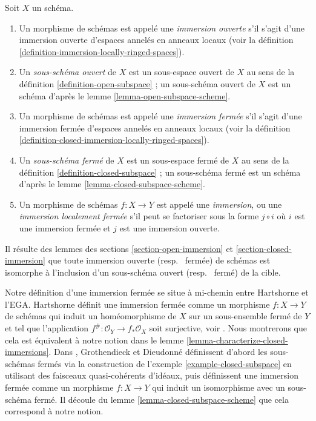 \begin{definition}
\label{definition-immersion}
Soit $X$ un schéma.
\begin{enumerate}
\item Un morphisme de schémas est appelé une {\it immersion ouverte}
s'il s'agit d'une immersion ouverte d'espaces annelés en anneaux
locaux (voir la définition \ref{definition-immersion-locally-ringed-spaces}).
\item Un {\it sous-schéma ouvert} de $X$ est un sous-espace ouvert
de $X$ au sens de la définition \ref{definition-open-subspace} ; un sous-schéma ouvert
de $X$ est un schéma d'après le lemme \ref{lemma-open-subspace-scheme}.
\item Un morphisme de schémas est appelé une {\it immersion fermée}
s'il s'agit d'une immersion fermée d'espaces annelés en anneaux
locaux (voir la définition \ref{definition-closed-immersion-locally-ringed-spaces}).
\item Un {\it sous-schéma fermé} de $X$ est un sous-espace fermé
de $X$ au sens de la définition \ref{definition-closed-subspace} ; un sous-schéma fermé est
un schéma d'après le lemme \ref{lemma-closed-subspace-scheme}.
\item Un morphisme de schémas $f : X \to Y$ est appelé une {\it immersion}, ou une
{\it immersion localement fermée} s'il peut se factoriser sous la
forme $j \circ i$ où $i$ est une immersion fermée et $j$ est une immersion
ouverte.
\end{enumerate}
\end{definition}

\noindent
Il résulte des lemmes des sections \ref{section-open-immersion} et
\ref{section-closed-immersion} que toute immersion ouverte (resp. \ fermée) de
schémas est isomorphe à l'inclusion d'un sous-schéma ouvert (resp. \ fermé)
de la cible.

\medskip\noindent
Notre définition d'une immersion fermée se situe à mi-chemin entre Hartshorne
et l'EGA. Hartshorne définit une immersion fermée comme un morphisme $f : X \to Y$ de
schémas qui induit un homéomorphisme de $X$ sur un sous-ensemble fermé de $Y$
et tel que l'application $f^\# : \mathcal{O}_Y \to f_*\mathcal{O}_X$ soit surjective,
voir \cite[Page 85]{H}. Nous montrerons que cela est équivalent à notre
notion dans le lemme \ref{lemma-characterize-closed-immersions}. Dans
\cite{EGA}, Grothendieck et Dieudonné définissent d'abord les sous-schémas
fermés via la construction de l'exemple \ref{example-closed-subspace}
en utilisant des faisceaux quasi-cohérents d'idéaux, puis définissent une
immersion fermée comme un morphisme $f : X \to Y$ qui induit un isomorphisme
avec un sous-schéma fermé. Il découle du lemme \ref{lemma-closed-subspace-scheme}
que cela correspond à notre notion.

